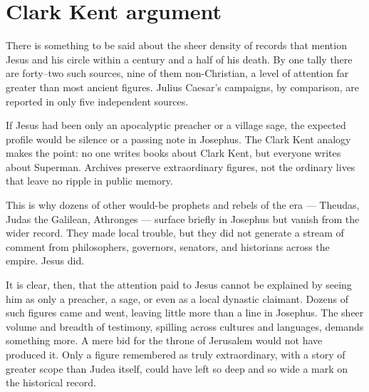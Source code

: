 \section{Clark Kent argument}\label{sec:clark-kent-argument}

There is something to be said about the sheer density of records that mention Jesus and his circle within a century and a half of his death.
By one tally there are forty–two such sources, nine of them non-Christian, a level of attention far greater than most ancient figures.
Julius Caesar’s campaigns, by comparison, are reported in only five independent sources.

If Jesus had been only an apocalyptic preacher or a village sage, the expected profile would be silence or a passing note in Josephus.
The Clark Kent analogy makes the point: no one writes books about Clark Kent, but everyone writes about Superman.
Archives preserve extraordinary figures, not the ordinary lives that leave no ripple in public memory.

This is why dozens of other would-be prophets and rebels of the era — Theudas, Judas the Galilean, Athronges — surface briefly in Josephus but vanish from the wider record.
They made local trouble, but they did not generate a stream of comment from philosophers, governors, senators, and historians across the empire.
Jesus did.

It is clear, then, that the attention paid to Jesus cannot be explained by seeing him as only a preacher, a sage, or even as a local dynastic claimant.
Dozens of such figures came and went, leaving little more than a line in Josephus.
The sheer volume and breadth of testimony, spilling across cultures and languages, demands something more.
A mere bid for the throne of Jerusalem would not have produced it.
Only a figure remembered as truly extraordinary, with a story of greater scope than Judea itself, could have left so deep and so wide a mark on the historical record.
